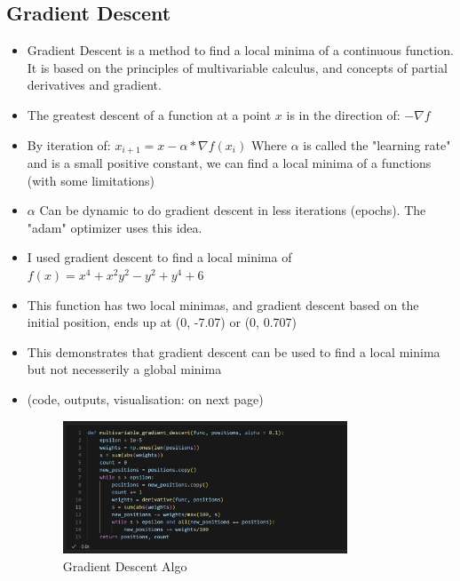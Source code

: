 \documentclass[12pt,a4paper]{article}
\begin{document}
\subsection{Gradient Descent}
\begin{itemize}
\item Gradient Descent is a method to find a local minima of a continuous function. It is based on the principles of multivariable calculus, and concepts of partial derivatives and gradient.
\item The greatest descent of a function at a point $x$ is in the direction of: $-\nabla f$
\item By iteration of:
\subitem $x_{i+1} = x - \alpha * \nabla f(x_{i})$
\subitem Where $\alpha$ is called the "learning rate" and is a small positive constant, we can find a local minima of a functions (with some limitations)
\item $\alpha$ Can be dynamic to do gradient descent in less iterations (epochs). The "adam" optimizer uses this idea.
\item I used gradient descent to find a local minima of 
\subitem $f(x) = x^4 + x^2y^2 - y^2 + y^4 + 6$
\item This function has two local minimas, and gradient descent based on the initial position, ends up at (0, -7.07) or (0, 0.707)
\item This demonstrates that gradient descent can be used to find a local minima but not necesserily a global minima 
\item (code, outputs, visualisation: on next page)
\pagebreak
\begin{figure}[h!]
    \centering
    \includegraphics[width=0.8\textwidth]{grad1} 
    \caption{Gradient Descent Algo}
    \label{fig:example}
\end{figure}


\end{itemize}
\end{document}
